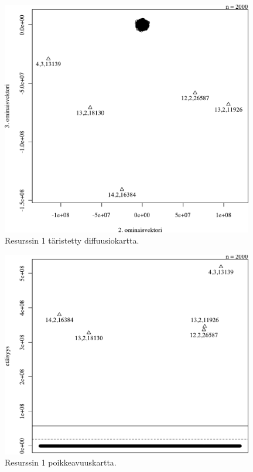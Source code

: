 \begin{figure}[p]
\centering
\includegraphics[width=11cm]{pics/diffuusiokuvat/service_1.pdf}
\caption{Resurssin 1 täristetty diffuusiokartta.}
\label{diffuusio_1}
\end{figure}

\begin{figure}[p]
\centering
\includegraphics[width=11cm]{pics/tiheyskuvat/service_1.pdf}
\caption{Resurssin 1 poikkeavuuskartta.}
\label{service_1}
\end{figure}

